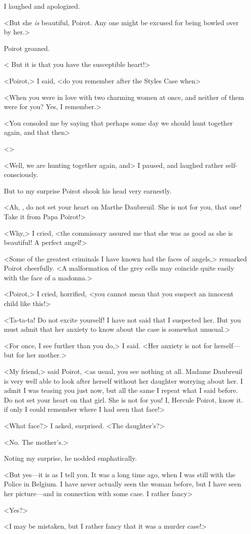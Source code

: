  I laughed and apologized. 

 <But she \emph{is} beautiful, Poirot. Any one might be excused for being bowled over by her.> 

 Poirot groaned. 

 < But it is that you have the susceptible heart!> 

 <Poirot,> I said, <do you remember after the Styles Case when\longdash> 

 <When you were in love with two charming women at once, and neither of them were for you? Yes, I remember.> 

 <You consoled me by saying that perhaps some day we should hunt together again, and that then\longdash> 

 <> 

 <Well, we are hunting together again, and\longdash> I paused, and laughed rather self-consciously. 

 But to my surprise Poirot shook his head very earnestly. 

 <Ah, , do not set your heart on Marthe Daubreuil. She is not for you, that one! Take it from Papa Poirot!> 

 <Why,> I cried, <the commissary assured me that she was as good as she is beautiful! A perfect angel!> 

 <Some of the greatest criminals I have known had the faces of angels,> remarked Poirot cheerfully. <A malformation of the grey cells may coincide quite easily with the face of a madonna.> 

 <Poirot,> I cried, horrified, <you cannot mean that you suspect an innocent child like this!> 

 <Ta-ta-ta! Do not excite yourself! I have not said that I suspected her. But you must admit that her anxiety to know about the case is somewhat unusual.> 

 <For once, I see further than you do,> I said. <Her anxiety is not for herself—but for her mother.> 

 <My friend,> said Poirot, <as usual, you see nothing at all. Madame Daubreuil is very well able to look after herself without her daughter worrying about her. I admit I was teasing you just now, but all the same I repeat what I said before. Do not set your heart on that girl. She is not for you! I, Hercule Poirot, know it.  if only I could remember where I had seen that face!> 

 <What face?> I asked, surprised. <The daughter's?> 

 <No. The mother's.> 

 Noting my surprise, he nodded emphatically. 

 <But yes—it is as I tell you. It was a long time ago, when I was still with the Police in Belgium. I have never actually seen the woman before, but I have seen her picture—and in connection with some case. I rather fancy\longdash> 

 <Yes?> 

 <I may be mistaken, but I rather fancy that it was a murder case!>